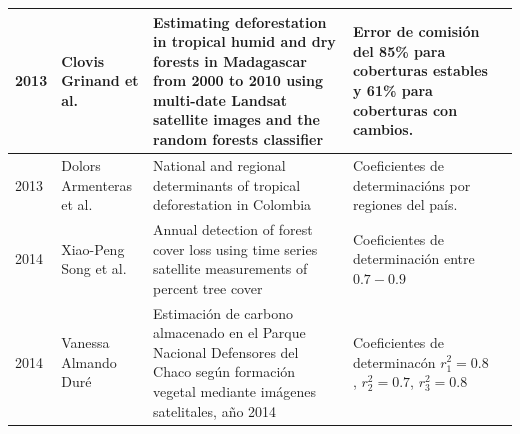 \documentclass[xcolor=table]{beamer}
\begin{document}
\begin{frame}
\begin{table}
{\begin{tabular}{|p{8cm}|p{8cm}|p{8cm}|p{8cm}|p{8cm}|}
					2013          & Clovis Grinand et al.                                  & Estimating deforestation in tropical humid and dry forests in Madagascar from 2000 to 2010 using multi-date Landsat satellite images and the random forests classifier & Error de comisi\'on del 85\% para coberturas estables y 61\% para coberturas con cambios. \\ \hline
					2013          & Dolors Armenteras et al.                               & National and regional determinants of tropical deforestation in Colombia                                                                                               & Coeficientes de determinaci\'ons por regiones del pa\'is.                                 \\ \hline
					2014          & Xiao-Peng Song et al.                                  & Annual detection of forest cover loss using time series satellite measurements of percent tree cover                                                                   & Coeficientes de determinaci\'on entre $ 0.7 - 0.9 $                                       \\ \hline
					2014           & Vanessa Almando Dur\'e                                 & Estimaci\'on de carbono almacenado en el Parque Nacional Defensores del Chaco seg\'un formaci\'on vegetal mediante im\'agenes satelitales, a\~{n}o 2014              & Coeficientes de determinac\'on $ r_{1}^{2}=0.8$, $ r_{2}^{2}=0.7 $, $r_{3}^{2}=0.8 $      \\ \hline
					

\end{tabular}}
\end{table}
\end{frame}
\end{document}

